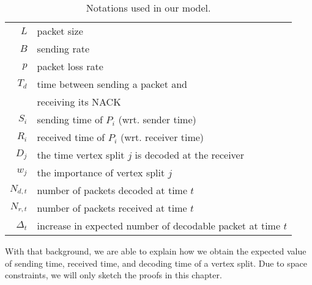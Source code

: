 
    \begin{table}[htp!]
    \begin{centering}
    \begin{tabular}{|r|l|}
    \hline
    $L$ & packet size \\
    $B$ & sending rate \\
    $p$ & packet loss rate \\
    $T_d$ & time between sending a packet and \\
          & receiving its NACK\\
    $S_i$ & sending time of $P_i$ (wrt. sender time)\\
    $R_i$ & received time of $P_i$ (wrt. receiver time)\\
    $D_j$ & the time vertex split $j$ is decoded at the receiver \\
    $w_j$ & the importance of vertex split $j$ \\
    $N_{d,t}$ & number of packets decoded at time $t$ \\
    $N_{r,t}$ & number of packets received at time $t$ \\
    $\Delta_t$ & increase in expected number of decodable packet at time $t$\\
    \hline
    \end{tabular}
    \caption{Notations used in our model\label{t:model:notation}.}
    \end{centering}
    \end{table}

    With that background, we are able to explain how we obtain the
    expected value of sending time, received time, and decoding time
    of a vertex split.
\if{}
    Due to space constraints, we will only sketch the proofs in this
    chapter.
\fi

